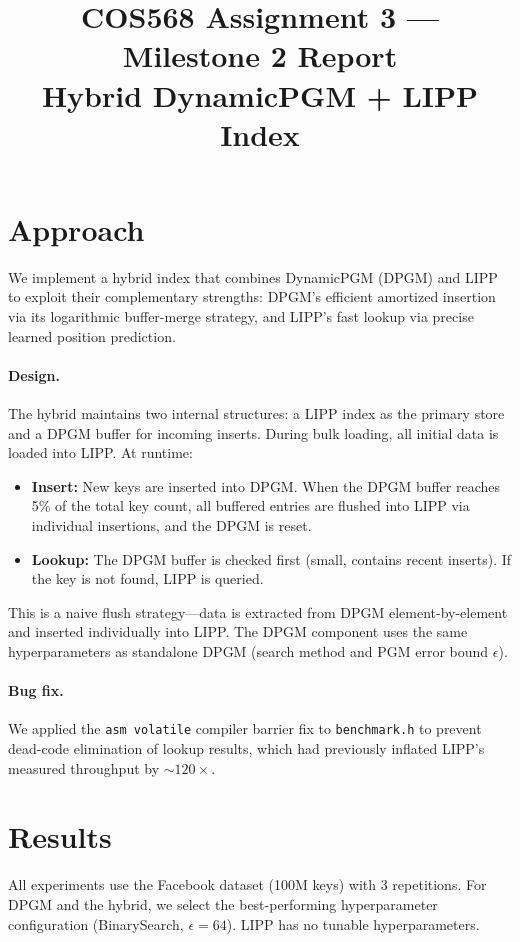 \documentclass[11pt]{article}
\title{COS568 Assignment 3 --- Milestone 2 Report\\
\large Hybrid DynamicPGM + LIPP Index}
\author{}
\date{}
\begin{document}
\maketitle

\section{Approach}

We implement a hybrid index that combines DynamicPGM (DPGM) and LIPP to exploit their complementary strengths: DPGM's efficient amortized insertion via its logarithmic buffer-merge strategy, and LIPP's fast lookup via precise learned position prediction.

\paragraph{Design.}
The hybrid maintains two internal structures: a LIPP index as the primary store and a DPGM buffer for incoming inserts. During bulk loading, all initial data is loaded into LIPP. At runtime:
\begin{itemize}
    \item \textbf{Insert:} New keys are inserted into DPGM. When the DPGM buffer reaches 5\% of the total key count, all buffered entries are flushed into LIPP via individual insertions, and the DPGM is reset.
    \item \textbf{Lookup:} The DPGM buffer is checked first (small, contains recent inserts). If the key is not found, LIPP is queried.
\end{itemize}
This is a naive flush strategy---data is extracted from DPGM element-by-element and inserted individually into LIPP. The DPGM component uses the same hyperparameters as standalone DPGM (search method and PGM error bound $\epsilon$).

\paragraph{Bug fix.}
We applied the \texttt{asm volatile} compiler barrier fix to \texttt{benchmark.h} to prevent dead-code elimination of lookup results, which had previously inflated LIPP's measured throughput by ${\sim}120\times$.

\section{Results}

All experiments use the Facebook dataset (100M keys) with 3 repetitions. For DPGM and the hybrid, we select the best-performing hyperparameter configuration (BinarySearch, $\epsilon = 64$). LIPP has no tunable hyperparameters.
\end{document}

